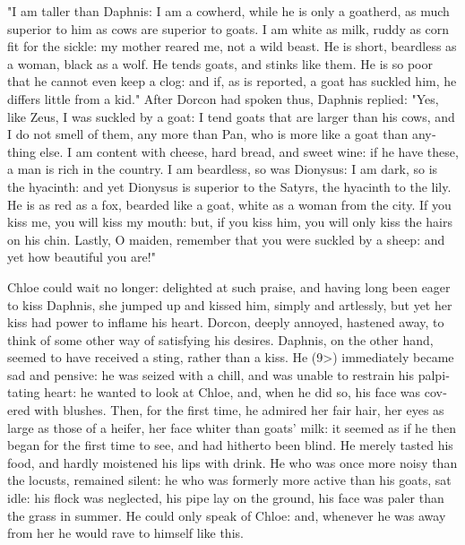\documentclass{book}
\begin{document}
\begin{pairs}
\begin{Rightside}
\begin{english}
  "I am taller than Daphnis: I am a cowherd, while he is only a goatherd, as much superior to him as cows are superior to goats.  I am white as milk, ruddy as corn fit for the sickle: my mother reared me, not a wild beast.  He is short, beardless as a woman, black as a wolf.  He tends goats, and stinks like them.  He is so poor that he cannot even keep a clog: and if, as is reported, a goat has suckled him, he differs little from a kid." After Dorcon had spoken thus, Daphnis replied: "Yes, like Zeus, I was suckled by a goat: I tend goats that are larger than his cows, and I do not smell of them, any more than Pan, who is more like a goat than anything else.  I am content with cheese, hard bread, and sweet wine: if he have these, a man is rich in the country.  I am beardless, so was Dionysus: I am dark, so is the hyacinth: and yet Dionysus is superior to the Satyrs, the hyacinth to the lily.  He is as red as a fox, bearded like a goat, white as a woman from the city.  If you kiss me, you will kiss my mouth: but, if you kiss him, you will only kiss the hairs on his chin.  Lastly, O maiden, remember that you were suckled by a sheep: and yet how beautiful you are!"
\pend


  Chloe could wait no longer: delighted at such praise, and having long been eager to kiss Daphnis, she jumped up and kissed him, simply and artlessly, but yet her kiss had power to inflame his heart.  Dorcon, deeply annoyed, hastened away, to think of some other way of satisfying his desires.  Daphnis, on the other hand, seemed to have received a sting, rather than a kiss.  He (9>) immediately became sad and pensive: he was seized with a chill, and was unable to restrain his palpitating heart: he wanted to look at Chloe, and, when he did so, his face was covered with blushes.  Then, for the first time, he admired her fair hair, her eyes as large as those of a heifer, her face whiter than goats' milk: it seemed as if he then began for the first time to see, and had hitherto been blind.  He merely tasted his food, and hardly moistened his lips with drink.  He who was once more noisy than the locusts, remained silent: he who was formerly more active than his goats, sat idle: his flock was neglected, his pipe lay on the ground, his face was paler than the grass in summer.  He could only speak of Chloe: and, whenever he was away from her he would rave to himself like this.
\pend



\end{english}
\end{Rightside}
\end{pairs}
\end{document}
